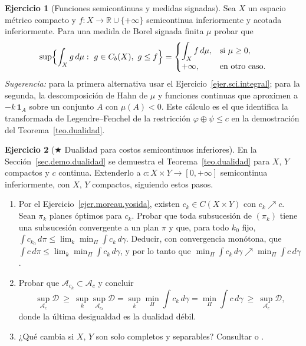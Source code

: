 \documentclass[12pt, a4paper]{amsbook}
\newcommand{\R}{{\mathbb R}}
\newcommand{\D}{{\mathcal D}}
\newcommand{\I}{{\mathbf 1}}
\theoremstyle{remark}
\theoremstyle{definition}
\newtheorem{ejercicio}{Ejercicio}[chapter]
\numberwithin{section}{chapter}
\numberwithin{subsection}{section}
\numberwithin{equation}{section}
\numberwithin{figure}{chapter}
\begin{document}
\begin{ejercicio}[Funciones semicontinuas y medidas signadas]\label{ejer.sci.signadas}
Sea $X$ un espacio métrico compacto y $f\colon X\to\R\cup\{+\infty\}$
semicontinua inferiormente y acotada inferiormente. Para una medida de
Borel signada finita $\mu$ probar que
\[
\sup\Bigl\{\int_Xg\,d\mu:\ g\in C_b(X),\ g\le f\Bigr\}
=\begin{cases}\displaystyle\int_Xf\,d\mu,&\text{si }\mu\ge0,\\[1ex]
+\infty,&\text{en otro caso.}\end{cases}
\]
\emph{Sugerencia:} para la primera alternativa usar el
Ejercicio~\ref{ejer.sci.integral}; para la segunda, la descomposición de
Hahn de $\mu$ y funciones continuas que aproximen a
$-k\,\I_{A}$ sobre un conjunto $A$ con $\mu(A)<0$. Este cálculo es el que
identifica la transformada de Legendre--Fenchel de la restricción
$\varphi\oplus\psi\le c$ en la demostración del Teorema~\ref{teo.dualidad}.
\end{ejercicio}

\begin{ejercicio}[$\bigstar$ Dualidad para costos semicontinuos inferiores]\label{ejer.dualidad.sci}
En la Sección~\ref{sec.demo.dualidad} se demuestra el Teorema~\ref{teo.dualidad}
para $X$, $Y$ compactos y $c$ continua. Extenderlo a $c\colon X\times Y\to[0,+\infty]$
semicontinua inferiormente, con $X$, $Y$ compactos, siguiendo estos pasos.
\begin{enumerate}[label=(\alph*)]
\item Por el Ejercicio~\ref{ejer.moreau.yosida}, existen $c_k\in C(X\times Y)$
con $c_k\nearrow c$. Sean $\pi_k$ planes óptimos para $c_k$. Probar que toda
subsucesión de $(\pi_k)$ tiene una subsucesión convergente a un plan $\pi$ y
que, para todo $k_0$ fijo,
$\int c_{k_0}\,d\pi\le\lim_k\min_{\Pi}\int c_k\,d\gamma$. Deducir, con
convergencia monótona, que $\int c\,d\pi\le\lim_k\min_\Pi\int c_k\,d\gamma$,
y por lo tanto que $\min_\Pi\int c_k\,d\gamma\nearrow\min_\Pi\int c\,d\gamma$.
\item Probar que $\mathcal A_{c_k}\subset\mathcal A_c$ y concluir
\[
\sup_{\mathcal A_c}\D\ \ge\ \sup_k\sup_{\mathcal A_{c_k}}\D
=\sup_k\min_\Pi\int c_k\,d\gamma=\min_\Pi\int c\,d\gamma\ \ge\ \sup_{\mathcal A_c}\D,
\]
donde la última desigualdad es la dualidad débil.
\item ¿Qué cambia si $X$, $Y$ son solo completos y separables? Consultar
\cite[Thm.~1.3]{Villani2003} o \cite[Thm.~1.39]{Santambrogio}.
\end{enumerate}
\end{ejercicio}
\end{document}

